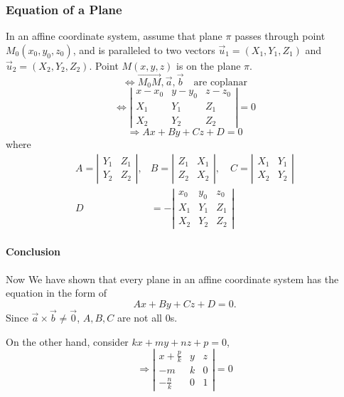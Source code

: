 \documentclass[UTF8]{ctexart}
\begin{document}
\subsubsection{Equation of a Plane}
In an affine coordinate system, assume that plane $\pi$ passes
through point $M_0(x_0,y_0,z_0)$, and is paralleled to two vectors 
$\vec u_1=(X_1,Y_1,Z_1)$ and $\vec u_2=(X_2,Y_2,Z_2)$. Point $M(x,y,z)$
is on the plane $\pi$.
$$
\iff \overrightarrow{M_0M},\vec a,\vec b \quad \text{are coplanar}
$$
$$
\iff
\left|\begin{array}{ccc}
  x-x_{0} & y-y_{0} & z-z_{0} \\
  X_{1} & Y_{1} & Z_{1} \\
  X_{2} & Y_{2} & Z_{2}
  \end{array}\right|=0
$$
$$
\Rightarrow Ax+By+Cz+D=0
$$
where
$$
\begin{aligned}
  A=\left|\begin{array}{ll}
  Y_{1} & Z_{1} \\
  Y_{2} & Z_{2}
  \end{array}\right|, & B=\left|\begin{array}{ll}
  Z_{1} & X_{1} \\
  Z_{2} & X_{2}
  \end{array}\right|, \quad C=\left|\begin{array}{ll}
  X_{1} & Y_{1} \\
  X_{2} & Y_{2}
  \end{array}\right| \\
  D &=-\left|\begin{array}{lll}
  x_{0} & y_{0} & z_{0} \\
  X_{1} & Y_{1} & Z_{1} \\
  X_{2} & Y_{2} & Z_{2}
  \end{array}\right|
  \end{aligned}
$$
\paragraph{Conclusion}Now We have shown that every plane in an affine coordinate system 
has the equation in the form of
$$
Ax+By+Cz+D=0.
$$
Since $\vec a \times \vec b \neq \vec 0$,
$A,B,C$ are not all $0$s.


On the other hand, consider $kx+my+nz+p=0$, 
$$
\Rightarrow 
\left|\begin{array}{ccc}
  x+\frac{p}{k} & y & z \\
  -m & k & 0 \\
  -\frac{n}{k} & 0 & 1
  \end{array}\right|=0
$$
\end{document}
